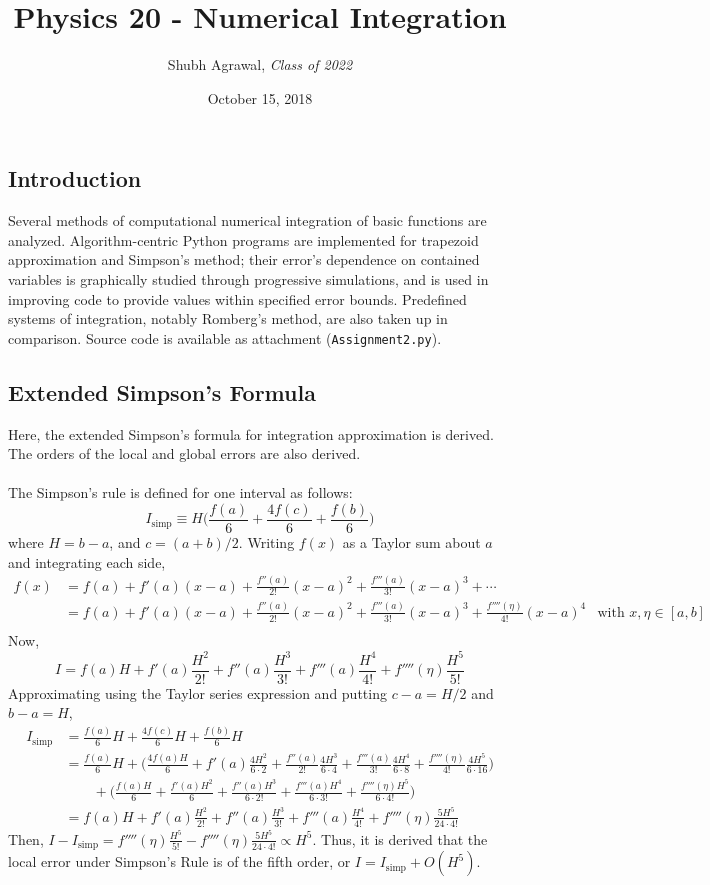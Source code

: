 \documentclass{report}
\title{\Large  Physics 20 - Numerical Integration}
\author{\large Shubh Agrawal, \normalsize\emph{Class of 2022}}
\date{\small October 15, 2018}
\begin{document}
\maketitle

\subsection*{Introduction}
Several methods of computational numerical integration of basic functions are analyzed. Algorithm-centric Python programs are implemented for trapezoid approximation and Simpson's method; their error's dependence on contained variables is graphically studied through progressive simulations, and is used in improving code to provide values within specified error bounds. Predefined systems of integration, notably Romberg's method,  are also taken up in comparison. Source code is available as attachment (\texttt{Assignment2.py}).
\subsection*{Extended Simpson's Formula}
Here, the extended Simpson's formula for integration approximation is derived. The orders of the local and global errors are also derived.
\\\\
The Simpson's rule is defined for one interval as follows:
$$I_{\text{simp}}\equiv H\Big(\frac{f(a)}{6}+\frac{4f(c)}{6}+\frac{f(b)}{6}\Big)$$
where $H =b-a$, and $c=(a+b)/2$. Writing $f(x)$ as a Taylor sum about $a$ and integrating each side,
\begin{align*}
	f(x) &= f(a)+ f'(a)(x-a)+\frac{f''(a)}{2!}(x-a)^2+\frac{f'''(a)}{3!}(x-a)^3+\cdots\\
	&=f(a)+f'(a)(x-a)+\frac{f''(a)}{2!}(x-a)^2+\frac{f'''(a)}{3!}(x-a)^3 + \frac{f''''(\eta)}{4!}(x-a)^4 &\text{with $x, \eta \in[a,b]$}\\
\end{align*}
Now, $$	I=f(a)H+f'(a)\frac{H^2}{2!}+f''(a)\frac{H^3}{3!}+f'''(a)\frac{H^4}{4!}+f''''(\eta)\frac{H^5}{5!}$$
Approximating using the Taylor series expression and putting $c-a=H/2$ and $b-a=H$,
\begin{align*}
	I_{\text{simp}}&= \frac{f(a)}{6}H+\frac{4f(c)}{6}H+\frac{f(b)}{6}H\\
	&=\frac{f(a)}{6}H+
	\Big(\frac{4f(a)H}{6}+f'(a)\frac{4H^2}{6\cdot 2}+\frac{f''(a)}{2!}\frac{4H^3}{6\cdot 4}+\frac{f'''(a)}{3!}\frac{4H^4}{6\cdot 8}+ \frac{f''''(\eta)}{4!}\frac{4H^5}{6\cdot 16} \Big)
	\\&\qquad+\Big( \frac{f(a)H}{6}+\frac{f'(a)H^2}{6}+\frac{f''(a)H^3}{6\cdot 2!}+\frac{f'''(a)H^4}{6\cdot 3!}+ \frac{f''''(\eta)H^5}{6\cdot 4!}\Big)\\
	&=f(a)H+f'(a)\frac{H^2}{2!}+f''(a)\frac{H^3}{3!}+f'''(a)\frac{H^4}{4!}+f''''(\eta)\frac{5H^5}{24\cdot4!}
\end{align*} 
Then, $I - I_{\text{simp}} = f''''(\eta)\frac{H^5}{5!} - f''''(\eta)\frac{5H^5}{24\cdot4!} \propto H^5$. Thus, it is derived that the local error under Simpson's Rule is of the fifth order, or $I= I_{\text{simp}} + O(H^5)$.
\end{document}
